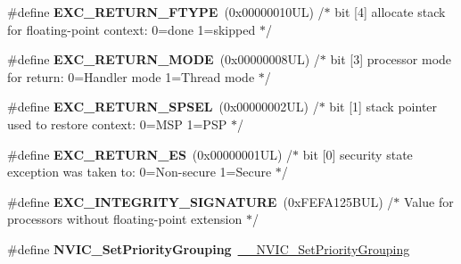 \begin{DoxyCompactItemize}
\#define {\bfseries E\+X\+C\+\_\+\+R\+E\+T\+U\+R\+N\+\_\+\+F\+T\+Y\+PE}~(0x00000010\+U\+L)     /$\ast$ bit \mbox{[}4\mbox{]} allocate stack for floating-\/point context\+: 0=done 1=skipped  $\ast$/
\item 
\mbox{\label{group___c_m_s_i_s___core___n_v_i_c_functions_gabb65f847769a7807395b2739cc9702d0}} 
\#define {\bfseries E\+X\+C\+\_\+\+R\+E\+T\+U\+R\+N\+\_\+\+M\+O\+DE}~(0x00000008\+U\+L)     /$\ast$ bit \mbox{[}3\mbox{]} processor mode for return\+: 0=\+Handler mode 1=\+Thread mode      $\ast$/
\item 
\mbox{\label{group___c_m_s_i_s___core___n_v_i_c_functions_ga686922b26c29eac540f53a6213627466}} 
\#define {\bfseries E\+X\+C\+\_\+\+R\+E\+T\+U\+R\+N\+\_\+\+S\+P\+S\+EL}~(0x00000002\+U\+L)     /$\ast$ bit \mbox{[}1\mbox{]} stack pointer used to restore context\+: 0=\+M\+S\+P 1=\+P\+S\+P           $\ast$/
\item 
\mbox{\label{group___c_m_s_i_s___core___n_v_i_c_functions_gac939dbf69d3063c76a28516a4ae84db7}} 
\#define {\bfseries E\+X\+C\+\_\+\+R\+E\+T\+U\+R\+N\+\_\+\+ES}~(0x00000001\+U\+L)     /$\ast$ bit \mbox{[}0\mbox{]} security state exception was taken to\+: 0=\+Non-\/secure 1=\+Secure $\ast$/
\item 
\mbox{\label{group___c_m_s_i_s___core___n_v_i_c_functions_ga7d1b21b2d863ccd9e23a3295b3173155}} 
\#define {\bfseries E\+X\+C\+\_\+\+I\+N\+T\+E\+G\+R\+I\+T\+Y\+\_\+\+S\+I\+G\+N\+A\+T\+U\+RE}~(0x\+F\+E\+F\+A125\+B\+U\+L)     /$\ast$ Value for processors without floating-\/point extension                $\ast$/
\item 
\mbox{\label{group___c_m_s_i_s___core___n_v_i_c_functions_ga0e798d5aec68cdd8263db86a76df788f}} 
\#define {\bfseries N\+V\+I\+C\+\_\+\+Set\+Priority\+Grouping}~\mbox{\hyperlink{group___c_m_s_i_s___core___n_v_i_c_functions_gafc94dcbaee03e4746ade1f5bb9aaa56d}{\+\_\+\+\_\+\+N\+V\+I\+C\+\_\+\+Set\+Priority\+Grouping}}
\item 
\mbox{\label{group___c_m_s_i_s___core___n_v_i_c_functions_ga4eeb9214f2264fc23c34ad5de2d3fa11}} 

\end{DoxyCompactItemize}
